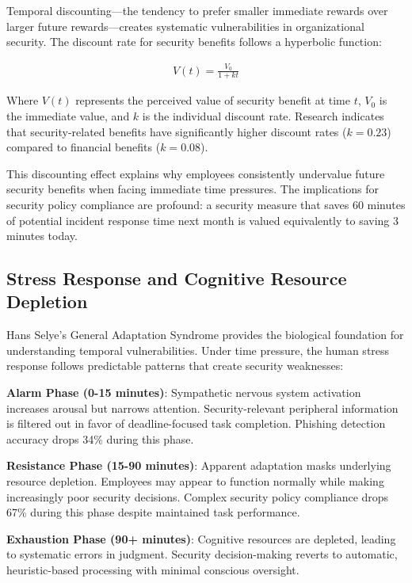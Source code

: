 \documentclass[11pt,a4paper]{article}
\begin{document}
Temporal discounting---the tendency to prefer smaller immediate rewards over larger future rewards---creates systematic vulnerabilities in organizational security. The discount rate for security benefits follows a hyperbolic function:

\begin{align}
V(t) = \frac{V_0}{1 + kt}
\end{align}

Where $V(t)$ represents the perceived value of security benefit at time $t$, $V_0$ is the immediate value, and $k$ is the individual discount rate. Research indicates that security-related benefits have significantly higher discount rates ($k = 0.23$) compared to financial benefits ($k = 0.08$).

This discounting effect explains why employees consistently undervalue future security benefits when facing immediate time pressures. The implications for security policy compliance are profound: a security measure that saves 60 minutes of potential incident response time next month is valued equivalently to saving 3 minutes today.

\subsection{Stress Response and Cognitive Resource Depletion}

Hans Selye's General Adaptation Syndrome provides the biological foundation for understanding temporal vulnerabilities. Under time pressure, the human stress response follows predictable patterns that create security weaknesses:

\textbf{Alarm Phase (0-15 minutes)}: Sympathetic nervous system activation increases arousal but narrows attention. Security-relevant peripheral information is filtered out in favor of deadline-focused task completion. Phishing detection accuracy drops 34\% during this phase.

\textbf{Resistance Phase (15-90 minutes)}: Apparent adaptation masks underlying resource depletion. Employees may appear to function normally while making increasingly poor security decisions. Complex security policy compliance drops 67\% during this phase despite maintained task performance.

\textbf{Exhaustion Phase (90+ minutes)}: Cognitive resources are depleted, leading to systematic errors in judgment. Security decision-making reverts to automatic, heuristic-based processing with minimal conscious oversight.
\end{document}
